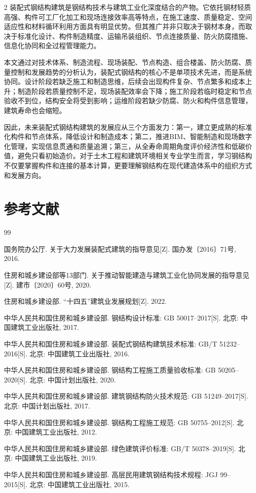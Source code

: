 \documentclass[UTF8,a4paper,10.5pt]{ctexart}
\begin{document}
\begin{multicols}{2}
装配式钢结构建筑是钢结构技术与建筑工业化深度结合的产物。它依托钢材轻质高强、构件可工厂化加工和现场连接效率高等特点，在施工速度、质量稳定、空间适应性和材料循环利用方面具有明显优势。但其推广并非只取决于钢材本身，而取决于标准化设计、构件制造精度、运输吊装组织、节点连接质量、防火防腐措施、信息化协同和全过程管理能力。

本文通过对技术体系、制造流程、现场装配、节点构造、组合楼盖、防火防腐、质量控制和发展趋势的分析认为，装配式钢结构的核心不是单项技术先进，而是系统协同。设计阶段若缺乏施工和制造思维，后续会出现构件复杂、节点繁多和成本上升；制造阶段若质量控制不足，现场装配效率会下降；施工阶段若临时稳定和节点验收不到位，结构安全将受到影响；运维阶段若缺少防腐、防火和构件信息管理，建筑寿命也会缩短。

因此，未来装配式钢结构建筑的发展应从三个方面发力：第一，建立更成熟的标准化构件和节点体系，降低设计和制造成本；第二，推进BIM、智能制造和现场数字化管理，实现信息贯通和质量追溯；第三，从全寿命周期角度评价经济性和低碳价值，避免只看初始造价。对于土木工程和建筑环境相关专业学生而言，学习钢结构不仅要掌握构件和连接的基本计算，更要理解钢结构在现代建造体系中的组织方式和发展方向。

\section*{参考文献}
\begin{thebibliography}{99}

国务院办公厅. 关于大力发展装配式建筑的指导意见[Z]. 国办发〔2016〕71号, 2016.

住房和城乡建设部等13部门. 关于推动智能建造与建筑工业化协同发展的指导意见[Z]. 建市〔2020〕60号, 2020.

住房和城乡建设部. “十四五”建筑业发展规划[Z]. 2022.

中华人民共和国住房和城乡建设部. 钢结构设计标准: GB 50017--2017[S]. 北京: 中国建筑工业出版社, 2017.

中华人民共和国住房和城乡建设部. 装配式钢结构建筑技术标准: GB/T 51232--2016[S]. 北京: 中国建筑工业出版社, 2016.

中华人民共和国住房和城乡建设部. 钢结构工程施工质量验收标准: GB 50205--2020[S]. 北京: 中国计划出版社, 2020.

中华人民共和国住房和城乡建设部. 建筑钢结构防火技术规范: GB 51249--2017[S]. 北京: 中国计划出版社, 2017.

中华人民共和国住房和城乡建设部. 钢结构工程施工规范: GB 50755--2012[S]. 北京: 中国建筑工业出版社, 2012.

中华人民共和国住房和城乡建设部. 绿色建筑评价标准: GB/T 50378--2019[S]. 北京: 中国建筑工业出版社, 2019.

中华人民共和国住房和城乡建设部. 高层民用建筑钢结构技术规程: JGJ 99--2015[S]. 北京: 中国建筑工业出版社, 2015.

\end{thebibliography}

\end{multicols}
\end{document}
